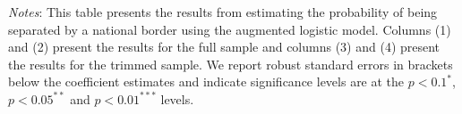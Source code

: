 \begin{table}[H]
    \centering
    \caption{Propensity score estimation: Estimation}
    \label{tab: app_prop_score_estimation}
    \begin{spacing}{1}
    \end{spacing}
    \parbox{1\textwidth}{
    \vspace{10pt}
    \begin{spacing}{1} 
        {\footnotesize 
        \textit{Notes}: This table presents the results from estimating the probability of being separated by a national border using the augmented logistic model. Columns (1) and (2) present the results for the full sample and columns (3) and (4) present the results for the trimmed sample. We report robust standard errors in brackets below the coefficient estimates and indicate significance levels are at the $p<0.1^{*}$,$p<0.05^{**}$ and $p<0.01^{***}$ levels.}
        \end{spacing}}
\end{table}

